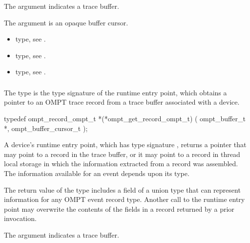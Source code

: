 \argdesc
The  argument indicates a trace buffer.

The  argument is an opaque buffer cursor.

\crossreferences
\begin{itemize}
\item {} type, see .

\item {} type, see .

\item {} type, see .
\end{itemize}



\subsubsection{}
\label{sec:ompt_get_record_ompt_t}

\summary
The  type is the type signature of the 
 runtime entry point, which obtains a pointer 
to an OMPT trace record from a trace buffer associated with a device.

\format
\begin{ccppspecific}
\begin{omptInquiry}
typedef ompt_record_ompt_t *(*ompt_get_record_ompt_t) (
  ompt_buffer_t *,
  ompt_buffer_cursor_t 
);
\end{omptInquiry}
\end{ccppspecific}

\descr
A device's  runtime entry point, which has
type signature , returns a pointer that may 
point to a record in the trace buffer, or it may point to a record in 
thread local storage in which the information extracted from a record was 
assembled. The information available for an event depends upon its type.

The return value of the  type includes a field 
of a union type that can represent information for any OMPT event record 
type. Another call to the runtime entry point may overwrite the contents 
of the fields in a record returned by a prior invocation.

\argdesc
The  argument indicates a trace buffer.

